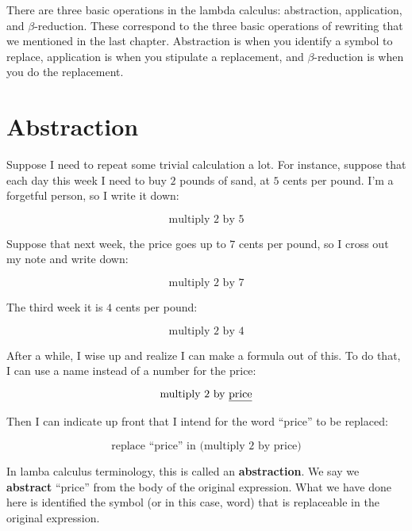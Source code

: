 \documentclass{book}
\numberwithin{equation}{chapter}
\newcommand{\vocab}{\textbf}
\begin{document}
There are three basic operations in the lambda calculus: abstraction, application, and $\beta$-reduction. These correspond to the three basic operations of rewriting that we mentioned in the last chapter. Abstraction is when you identify a symbol to replace, application is when you stipulate a replacement, and $\beta$-reduction is when you do the replacement.


\section{Abstraction}

Suppose I need to repeat some trivial calculation a lot. For instance, suppose that each day this week I need to buy $2$ pounds of sand, at $5$ cents per pound. I'm a forgetful person, so I write it down:

\begin{equation}
\text{multiply 2 by 5}
\end{equation}

\noindent
Suppose that next week, the price goes up to $7$ cents per pound, so I cross out my note and write down:

\begin{equation}
\text{multiply 2 by 7}
\end{equation}

\noindent
The third week it is $4$ cents per pound:

\begin{equation}
\text{multiply 2 by 4}
\end{equation}

\noindent
After a while, I wise up and realize I can make a formula out of this. To do that, I can use a name instead of a number for the price:

\begin{equation}
\text{multiply 2 by \underline{price}}
\end{equation}

\noindent
Then I can indicate up front that I intend for the word ``price'' to be replaced:

\begin{equation}
\text{replace ``price'' in (multiply 2 by price)}
\end{equation}

\noindent
In lamba calculus terminology, this is called an \vocab{abstraction}. We say we \vocab{abstract} ``price'' from the body of the original expression. What we have done here is identified the symbol (or in this case, word) that is replaceable in the original expression.
\end{document}
